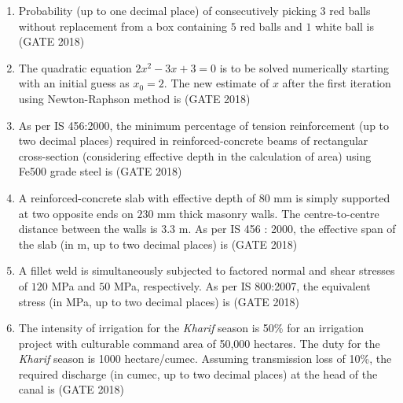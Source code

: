 \documentclass[journal,12pt,onecolumn]{IEEEtran}
\theoremstyle{remark}
\begin{document}
\begin{enumerate}
\item Probability (up to one decimal place) of consecutively picking $3$ red balls without replacement from a box containing $5$ red balls and $1$ white ball is \underline{\hspace{3cm}}
\hfill{(GATE 2018)}
\vspace{1cm}

\item The quadratic equation $2x^2 - 3x + 3 = 0$ is to be solved numerically starting with an initial guess as $x_0=2$. The new estimate of $x$ after the first iteration using Newton-Raphson method is \underline{\hspace{3cm}}
\hfill{(GATE 2018)}
\vspace{1cm}

\item As per IS 456:2000, the minimum percentage of tension reinforcement (up to two decimal places) required in reinforced-concrete beams of rectangular cross-section (considering effective depth in the calculation of area) using Fe500 grade steel is \underline{\hspace{3cm}}
\hfill{(GATE 2018)}
\vspace{1cm}

\item A reinforced-concrete slab with effective depth of $80$ mm is simply supported at two opposite ends on $230$ mm thick masonry walls. The centre-to-centre distance between the walls is $3.3$ m. As per IS 456 : 2000, the effective span of the slab (in m, up to two decimal places) is \underline{\hspace{3cm}}
\hfill{(GATE 2018)}
\vspace{1cm}

\item A fillet weld is simultaneously subjected to factored normal and shear stresses of $120$ MPa and $50$ MPa, respectively. As per IS 800:2007, the equivalent stress (in MPa, up to two decimal places) is \underline{\hspace{3cm}}
\hfill{(GATE 2018)}
\vspace{1cm}
\newpage
\item The intensity of irrigation for the \textit{Kharif} season is 50\% for an irrigation project with culturable command area of 50,000 hectares. The duty for the \textit{Kharif} season is 1000 hectare/cumec. Assuming transmission loss of 10\%, the required discharge (in cumec, up to two decimal places) at the head of the canal is \underline{\hspace{3cm}}
\hfill{(GATE 2018)}
\vspace{1cm}


\end{enumerate}
\end{document}
